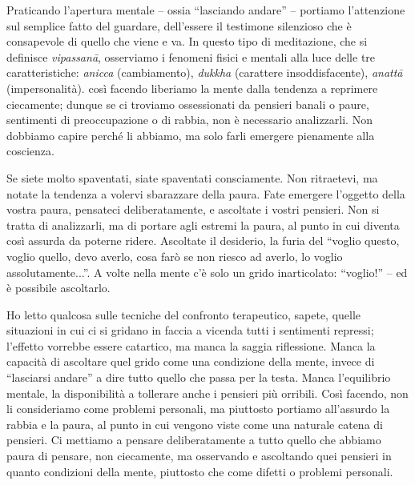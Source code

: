 
Praticando l'apertura mentale – ossia ``lasciando andare'' – portiamo
l'attenzione sul semplice fatto del guardare, dell'essere il testimone
silenzioso che è consapevole di quello che viene e va. In questo tipo di
meditazione, che si definisce \textit{vipassanā}, osserviamo i fenomeni fisici e
mentali alla luce delle tre caratteristiche: \textit{anicca} (cambiamento),
\textit{dukkha} (carattere insoddisfacente), \textit{anattā} (impersonalità). così facendo
liberiamo la mente dalla tendenza a reprimere ciecamente; dunque se ci
troviamo ossessionati da pensieri banali o paure, sentimenti di
preoccupazione o di rabbia, non è necessario analizzarli. Non dobbiamo
capire perché li abbiamo, ma solo farli emergere pienamente alla
coscienza.

Se siete molto spaventati, siate spaventati consciamente. Non
ritraetevi, ma notate la tendenza a volervi sbarazzare della paura. Fate
emergere l'oggetto della vostra paura, pensateci deliberatamente, e
ascoltate i vostri pensieri. Non si tratta di analizzarli, ma di portare
agli estremi la paura, al punto in cui diventa così assurda da poterne
ridere. Ascoltate il desiderio, la furia del ``voglio questo, voglio
quello, devo averlo, cosa farò se non riesco ad averlo, lo voglio
assolutamente...''. A volte nella mente c'è solo un grido inarticolato:
``voglio!'' – ed è possibile ascoltarlo.

Ho letto qualcosa sulle tecniche del confronto terapeutico, sapete,
quelle situazioni in cui ci si gridano in faccia a vicenda tutti i
sentimenti repressi; l'effetto vorrebbe essere catartico, ma manca la
saggia riflessione. Manca la capacità di ascoltare quel grido come una
condizione della mente, invece di ``lasciarsi andare'' a dire tutto quello
che passa per la testa. Manca l'equilibrio mentale, la disponibilità a
tollerare anche i pensieri più orribili. Così facendo, non li
consideriamo come problemi personali, ma piuttosto portiamo all'assurdo
la rabbia e la paura, al punto in cui vengono viste come una naturale
catena di pensieri. Ci mettiamo a pensare deliberatamente a tutto quello
che abbiamo paura di pensare, non ciecamente, ma osservando e ascoltando
quei pensieri in quanto condizioni della mente, piuttosto che come
difetti o problemi personali.

